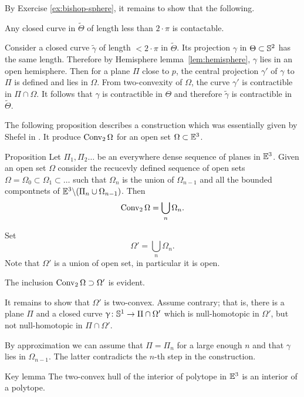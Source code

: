 By Exercise \ref{ex:bishop-sphere}, it remains to show that the following.
\begin{clm}{}
Any closed curve in $\tilde\Theta$ of length less than $2\cdot\pi$ is contactable.
\end{clm}


Consider a closed curve $\tilde \gamma$ of length $<2\cdot\pi$ in $\tilde\Theta$.
Its projection $\gamma$ in $\Theta\subset\SS^2$ has the same length.
Therefore by Hemisphere lemma~\ref{lem:hemisphere}, $\gamma$ lies in an open hemisphere.
Then for a plane $\Pi$ close to $p$,
the central projection $\gamma'$ of $\gamma$ to $\Pi$ is defined and lies in $\Omega$.
From two-convexity of $\Omega$, the curve $\gamma'$ is contractible in $\Pi\cap \Omega$.
It follows that $\gamma$ is contractible in $\Theta$ 
and therefore $\tilde\gamma$ is contractible in $\tilde\Theta$.
\qeds

The following proposition 
describes a construction which was essentially given by Shefel in \cite{shefel-3D}.
It produce $\mathop{\rm Conv}\nolimits_2 \Omega$ for an open set $\Omega\subset\EE^3$.

\begin{thm}{Proposition}\label{prop:2-conv-construction}
Let $\Pi_1,\Pi_2\dots$ be an everywhere dense
sequence of planes in $\mathbb{E}^3$.
Given an open set $\Omega$ consider 
the recucevly defined sequence of open sets 
$\Omega=\Omega_0\subset\Omega_1\subset\dots$ 
such that 
$\Omega_n$ is the union of $\Omega_{n-1}$ 
and all the bounded compontnets of 
$\EE^3\backslash(\Pi_n\cup \Omega_{n-1})$.
Then 
\[\mathop{\rm Conv}\nolimits_2\Omega=\bigcup_n\Omega_n.\]

\end{thm}

Set 
\[\Omega'=\bigcup_n\Omega_n.\]
Note that $\Omega'$ is a union of open set, in particular it is open.

The inclusion $\Conv_2\Omega\supset\Omega'$
is evident.

It remains to show that $\Omega'$ is two-convex.
Assume contrary; 
that is, there is a plane $\Pi$ 
and a closed curve $\gamma\:\SS^1\to \Pi\cap \Omega'$ 
which is null-homotopic in $\Omega'$,
but not null-homotopic in $\Pi\cap\Omega'$.

By approximation we can assume that $\Pi=\Pi_n$ for a large enough  $n$ 
and that $\gamma$ lies in $\Omega_{n-1}$.
The latter contradicts the $n$-th step in the construction. 
\qeds



\begin{thm}{Key lemma}\label{lem:key-shefel}
The two-convex hull of the interior of polytope in $\mathbb{E}^3$
is an interior of a polytope.
\end{thm}

